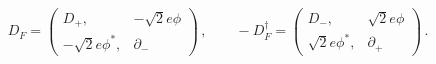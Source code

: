 \begin{equation}
D_F = \left( \begin{array}{cc} D_+,& -\sqrt{2} e\phi \\
                           -\sqrt{2}e\phi^*,&\partial_-
\end{array}\right)\,,\qquad
-D_F^\dag = \left( \begin{array}{cc} D_-,& \sqrt{2} e\phi \\
                           \sqrt{2}e\phi^*,&\partial_+
\end{array}\right)\,.\label{DFDF}
\end{equation}

